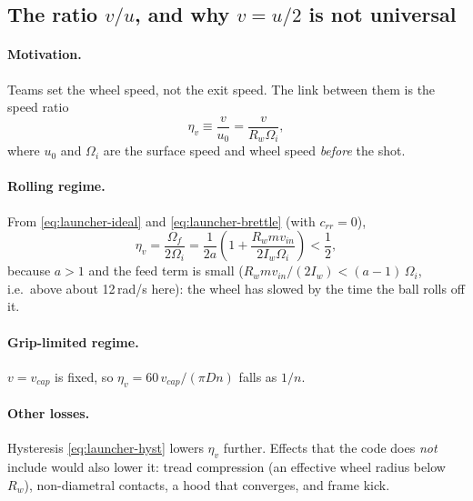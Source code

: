\subsection{The ratio $v/u$, and why $v = u/2$ is not universal}
\label{sec:launcher:vu}

\paragraph{Motivation.} Teams set the wheel speed, not the exit speed. The link between them is the
speed ratio
\begin{equation}
  \eta_v \equiv \frac{v}{u_0} = \frac{v}{R_w\Omega_i},
  \label{eq:launcher-etav}
\end{equation}
where $u_0$ and $\Omega_i$ are the surface speed and wheel speed \emph{before} the shot.

\paragraph{Rolling regime.} From \eqref{eq:launcher-ideal} and \eqref{eq:launcher-brettle} (with $c_{rr} = 0$),
\begin{equation}
  \eta_v = \frac{\Omega_f}{2\Omega_i}
         = \frac{1}{2a}\left(1 + \frac{R_w m v_{in}}{2 I_w \Omega_i}\right) < \frac12 ,
  \label{eq:launcher-etav_roll}
\end{equation}
because $a > 1$ and the feed term is small ($R_w m v_{in}/(2I_w) < (a-1)\,\Omega_i$, i.e.\ above about
12\,\unit{rad/s}\derived{} here): the wheel has slowed by the time the ball rolls off it.

\paragraph{Grip-limited regime.} $v = v_{cap}$ is fixed, so $\eta_v = 60\,v_{cap}/(\pi D n)$ falls as
$1/n$.

\paragraph{Other losses.} Hysteresis \eqref{eq:launcher-hyst} lowers $\eta_v$ further. Effects that the code
does \emph{not} include would also lower it: tread compression (an effective wheel radius below $R_w$),
non-diametral contacts, a hood that converges, and frame kick.

